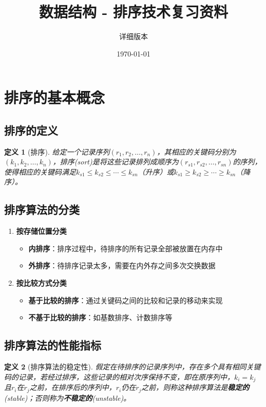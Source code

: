 \documentclass[12pt,a4paper]{amsart}
\title{\textbf{数据结构 - 排序技术复习资料}}
\author{详细版本}
\date{\today}
\newtheorem{definition}{定义}[section]
\begin{document}

\section{排序的基本概念}

\subsection{排序的定义}

\begin{definition}[排序]
给定一个记录序列$(r_1, r_2, \ldots, r_n)$，其相应的关键码分别为$(k_1, k_2, \ldots, k_n)$，排序(sort)是将这些记录排列成顺序为$(r_{s1}, r_{s2}, \ldots, r_{sn})$的序列，使得相应的关键码满足$k_{s1} \leq k_{s2} \leq \cdots \leq k_{sn}$（升序）或$k_{s1} \geq k_{s2} \geq \cdots \geq k_{sn}$（降序）。
\end{definition}

\subsection{排序算法的分类}

\begin{enumerate}
\item \textbf{按存储位置分类}
\begin{itemize}
\item \textbf{内排序}：排序过程中，待排序的所有记录全部被放置在内存中
\item \textbf{外排序}：待排序记录太多，需要在内外存之间多次交换数据
\end{itemize}

\item \textbf{按比较方式分类}
\begin{itemize}
\item \textbf{基于比较的排序}：通过关键码之间的比较和记录的移动来实现
\item \textbf{不基于比较的排序}：如基数排序、计数排序等
\end{itemize}
\end{enumerate}

\subsection{排序算法的性能指标}

\begin{definition}[排序算法的稳定性]
假定在待排序的记录序列中，存在多个具有相同关键码的记录，若经过排序，这些记录的相对次序保持不变，即在原序列中，$k_i = k_j$且$r_i$在$r_j$之前，在排序后的序列中，$r_i$仍在$r_j$之前，则称这种排序算法是\textbf{稳定的}(stable)；否则称为\textbf{不稳定的}(unstable)。
\end{definition}
\end{document}
